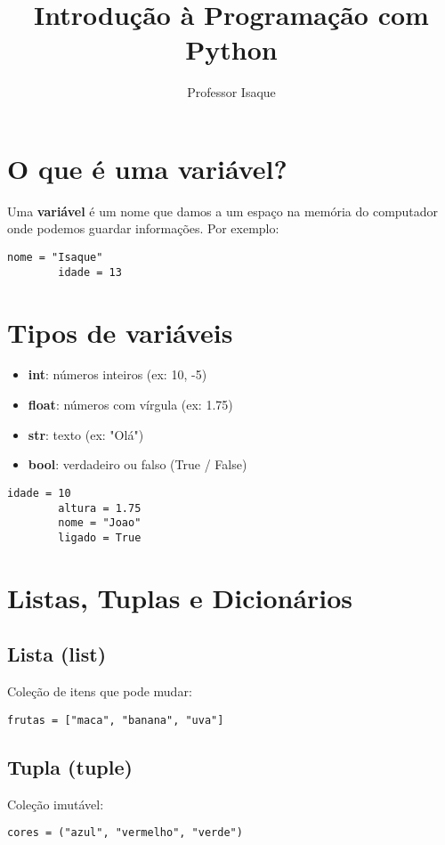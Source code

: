 \documentclass[12pt]{article}
\title{Introdução à Programação com Python}
\author{Professor Isaque}
\date{}
\begin{document}
	
	\maketitle
	
	\section{O que é uma variável?}
	Uma \textbf{variável} é um nome que damos a um espaço na memória do computador onde podemos guardar informações. Por exemplo:
	
	\begin{lstlisting}[style=pythonstyle]
		nome = "Isaque"
		idade = 13
	\end{lstlisting}
	
	\section{Tipos de variáveis}
	\begin{itemize}
		\item \textbf{int}: números inteiros (ex: 10, -5)
		\item \textbf{float}: números com vírgula (ex: 1.75)
		\item \textbf{str}: texto (ex: "Olá")
		\item \textbf{bool}: verdadeiro ou falso (True / False)
	\end{itemize}
	
	\begin{lstlisting}[style=pythonstyle]
		idade = 10
		altura = 1.75
		nome = "Joao"
		ligado = True
	\end{lstlisting}
	
	\section{Listas, Tuplas e Dicionários}
	
	\subsection*{Lista (list)}
	Coleção de itens que pode mudar:
	\begin{lstlisting}[style=pythonstyle]
		frutas = ["maca", "banana", "uva"]
	\end{lstlisting}
	
	\subsection*{Tupla (tuple)}
	Coleção imutável:
	\begin{lstlisting}[style=pythonstyle]
		cores = ("azul", "vermelho", "verde")
	\end{lstlisting}
	
\end{document}
